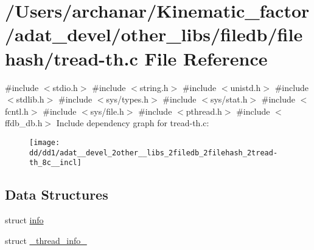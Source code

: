 \hypertarget{adat__devel_2other__libs_2filedb_2filehash_2tread-th_8c}{}\section{/\+Users/archanar/\+Kinematic\+\_\+factor/adat\+\_\+devel/other\+\_\+libs/filedb/filehash/tread-\/th.c File Reference}
\label{adat__devel_2other__libs_2filedb_2filehash_2tread-th_8c}
{\ttfamily \#include $<$stdio.\+h$>$}\newline
{\ttfamily \#include $<$string.\+h$>$}\newline
{\ttfamily \#include $<$unistd.\+h$>$}\newline
{\ttfamily \#include $<$stdlib.\+h$>$}\newline
{\ttfamily \#include $<$sys/types.\+h$>$}\newline
{\ttfamily \#include $<$sys/stat.\+h$>$}\newline
{\ttfamily \#include $<$fcntl.\+h$>$}\newline
{\ttfamily \#include $<$sys/file.\+h$>$}\newline
{\ttfamily \#include $<$pthread.\+h$>$}\newline
{\ttfamily \#include $<$ffdb\+\_\+db.\+h$>$}\newline
Include dependency graph for tread-\/th.c\+:
\nopagebreak
\begin{figure}[H]
\begin{center}
\leavevmode
\texttt{[image: dd/dd1/adat\_\_devel\_2other\_\_libs\_2filedb\_2filehash\_2tread-th\_8c\_\_incl]}
\end{center}
\end{figure}
\subsection*{Data Structures}
\begin{DoxyCompactItemize}
\item 
struct \mbox{\hyperlink{structinfo}{info}}
\item 
struct \mbox{\hyperlink{struct__thread__info__}{\+\_\+thread\+\_\+info\+\_\+}}
\end{DoxyCompactItemize}
